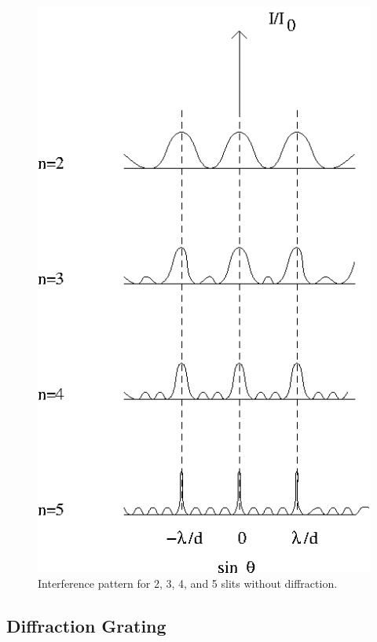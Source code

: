 \begin{figure}[htb]
\centering 
\epsfxsize=6cm \includegraphics[scale=0.6]{10_diffraction/internodiff.eps}
\caption{Interference pattern for 2, 3, 4, and 5 slits without diffraction.}
\label{fig:diff:intnodiff}
\end{figure}

\subsection{Diffraction Grating}

